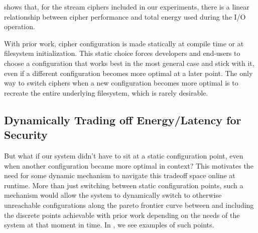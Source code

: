  shows that, for the stream ciphers included in
our experiments, there is a linear relationship between cipher performance and
total energy used during the I/O operation.

With prior work,  cipher configuration is made
statically at compile time or at filesystem initialization. This static choice
forces developers and end-users to choose a configuration that works best in the
most general case and stick with it, even if a different configuration becomes
more optimal at a later point. The only way to switch ciphers when a new
configuration becomes more optimal is to recreate the entire underlying
filesystem, which is rarely desirable.  

\subsection{Dynamically Trading off Energy/Latency for Security}

 But what if our system didn't have to
sit at a static configuration point, even when another configuration became more
optimal in context? This motivates the need for some dynamic mechanism to
navigate this tradeoff space online at runtime. More than just switching between
static configuration points, such a mechanism would allow the system to
dynamically switch to otherwise unreachable configurations along the pareto
frontier curve between and including the discrete points achievable with prior
work depending on the needs of the system at that moment in time. In
, we see examples of such points.

